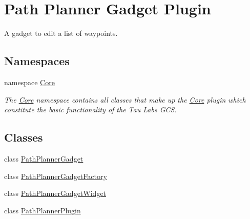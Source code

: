 \hypertarget{group___path_planner_gadget_plugin}{\section{Path Planner Gadget Plugin}
\label{group___path_planner_gadget_plugin}
}


A gadget to edit a list of waypoints.  


\subsection*{Namespaces}
\begin{DoxyCompactItemize}
\item 
namespace \hyperlink{namespace_core}{Core}
\begin{DoxyCompactList}\small\item\em The \hyperlink{namespace_core}{Core} namespace contains all classes that make up the \hyperlink{namespace_core}{Core} plugin which constitute the basic functionality of the Tau Labs G\-C\-S. \end{DoxyCompactList}\end{DoxyCompactItemize}
\subsection*{Classes}
\begin{DoxyCompactItemize}
\item 
class \hyperlink{class_path_planner_gadget}{Path\-Planner\-Gadget}
\item 
class \hyperlink{class_path_planner_gadget_factory}{Path\-Planner\-Gadget\-Factory}
\item 
class \hyperlink{class_path_planner_gadget_widget}{Path\-Planner\-Gadget\-Widget}
\item 
class \hyperlink{class_path_planner_plugin}{Path\-Planner\-Plugin}
\end{DoxyCompactItemize}
